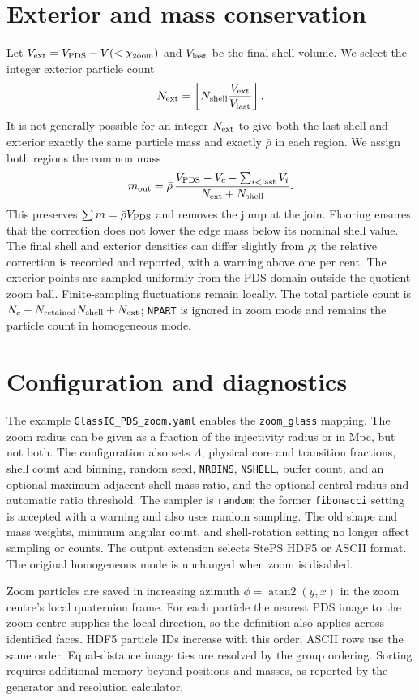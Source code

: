 \documentclass[11pt]{article}
\begin{document}
\section{Exterior and mass conservation}
Let \(V_{\rm ext}=V_{\rm PDS}-V(<\chi_{\rm zoom})\) and \(V_{\rm last}\)
be the final shell volume. We select the integer exterior particle count
\[
 N_{\rm ext}=\left\lfloor N_{\rm shell}
 \frac{V_{\rm ext}}{V_{\rm last}}\right\rfloor .
\]
It is not generally possible for an integer \(N_{\rm ext}\) to give both the
last shell and exterior exactly the same particle mass and exactly
\(\bar\rho\) in each region. We assign both regions the common mass
\[
 m_{\rm out}=\bar\rho\,
 \frac{V_{\rm PDS}-V_c-\sum_{i<{\rm last}}V_i}
 {N_{\rm ext}+N_{\rm shell}}.
\]
This preserves \(\sum m=\bar\rho V_{\rm PDS}\) and removes the jump at the
join. Flooring ensures that the correction does not lower the edge mass
below its nominal shell value. The final shell and exterior densities can
differ slightly from \(\bar\rho\); the relative correction is recorded and
reported, with a warning above one per cent. The exterior points are sampled
uniformly from the PDS domain outside the quotient zoom ball. Finite-sampling
fluctuations remain locally. The total particle count is
\(N_c+N_{\rm retained}N_{\rm shell}+N_{\rm ext}\); \texttt{NPART} is ignored in zoom
mode and remains the particle count in homogeneous mode.

\section{Configuration and diagnostics}
The example \texttt{GlassIC\_PDS\_zoom.yaml} enables the
\texttt{zoom\_glass} mapping. The zoom radius can be given as a fraction of
the injectivity radius or in Mpc, but not both. The configuration also sets
\(\Lambda\), physical core and transition fractions, shell count and binning,
random seed, \texttt{NRBINS}, \texttt{NSHELL}, buffer count, and an optional
maximum adjacent-shell mass ratio, and the optional central radius and automatic
ratio threshold.
The sampler is \texttt{random}; the former \texttt{fibonacci} setting is
accepted with a warning and also uses random sampling. The old shape and mass weights, minimum angular count, and shell-rotation
setting no longer affect sampling or counts.
The output extension selects StePS HDF5 or ASCII format. The original
homogeneous mode is unchanged when zoom is disabled.

Zoom particles are saved in increasing azimuth \(\phi=\operatorname{atan2}(y,x)\)
in the zoom centre's local quaternion frame. For each particle the nearest
PDS image to the zoom centre supplies the local direction, so the definition
also applies across identified faces. HDF5 particle IDs increase with this
order; ASCII rows use the same order. Equal-distance image ties are resolved by
the group ordering. Sorting requires additional memory beyond positions and
masses, as reported by the generator and resolution calculator.
\end{document}
